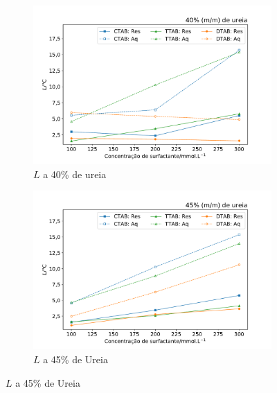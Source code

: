	\begin{figure}[H]
	 	\centering
	 	\begin{subfigure}[t]{0.45\textwidth}
	 		\includegraphics[width=\textwidth]{./imagens/dsc/L_40p_1_300mM_aq_res}
	 		\caption{$L$ a 40\% de ureia}
	 		\label{fig:DSC_L_40pUr}
	 	\end{subfigure} \qquad %
	 	\begin{subfigure}[t]{0.45\textwidth}
	 		\includegraphics[width=\textwidth]{./imagens/dsc/L_45p_1_300mM_aq_res}
	 		\caption{$L$ a 45\% de Ureia}
	 		\label{fig:DSC_L_45pUr}
	 	\end{subfigure}
 	

\end{figure}

